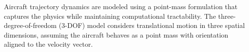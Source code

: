 Aircraft trajectory dynamics are modeled using a point-mass formulation that captures the physics while maintaining computational tractability. The three-degree-of-freedom (3-DOF) model considers translational motion in three spatial dimensions, assuming the aircraft behaves as a point mass with orientation aligned to the velocity vector.
